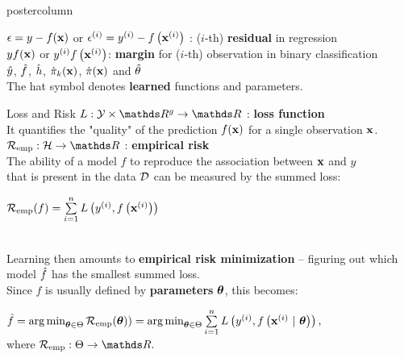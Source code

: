 \documentclass{beamer}
\begin{document}
\begin{frame}[fragile]{}
\begin{columns}
\begin{column}{.31\textwidth}
\begin{beamercolorbox}[center]{postercolumn}
\begin{minipage}{.98\textwidth}
{\begin{myblock}{}

$\epsilon = y - f(\mathbf{x})$ or $\epsilon^{(i)} = y^{(i)} - f\left(\mathbf{x}^{(i)}\right)$ : ($i$-th) \textbf{residual} in regression\\

$y f(\mathbf{x})$ or $y^{(i)} f\left(\mathbf{x}^{(i)}\right)$: \textbf{margin} for ($i$-th) observation in binary classification\\%

$\hat{y}$, $\hat{f}$, $\hat{h}$, $\hat \pi_{k}(\mathbf{x})$, $\hat \pi(\mathbf{x})$ and $\hat{\theta}$ \\
The hat symbol denotes \textbf{learned} functions and parameters.
\end{myblock}
\begin{myblock}{Loss and Risk}
  $L: \Yspace \times \R^g \to \R$ : \textbf{loss function} \\
 It quantifies the "quality" of the prediction $f(\mathbf{x})$ for a single
 observation $\mathbf{x}$.  \\
  
  $\riske:  \Hspace \to \R $ : \textbf{empirical risk } \\
The ability of a model $f$ to reproduce the association between $\mathbf{x}$ and $y$ \\
that is present in the data $\mathcal{D}$ can be measured by the summed loss:\\
  
\begin{center}
  $\mathcal{R}_{\text{emp}}(f) = \sum\limits_{i=1}^n L\left(y^{(i)}, f\left(\mathbf{x}^{(i)}\right)\right)$ 
\end{center}  
\\
  
Learning then amounts to \textbf{empirical risk minimization} -- figuring out which model $\hat{f}$ has the smallest summed loss. \\ 
Since $f$ is usually defined by \textbf{parameters} $\bm{\theta}$, this becomes:\\

\begin{center}
$\hat{f} = \operatorname{arg\,min}_{\bm{\theta} \in \Theta} \mathcal{R}_{\text{emp}}(\bm{\theta})) = \operatorname{arg\,min}_{\bm{\theta} \in \Theta} \sum\limits_{i=1}^n L\left(y^{(i)}, f\left(\mathbf{x}^{(i)} ~|~ \bm{\theta}\right)\right),$ \\
where $\riske : \Theta \to \R.$
\end{center}


\end{myblock}}
\end{minipage}
\end{beamercolorbox}
\end{column}
\end{columns}
\end{frame}
\end{document}
